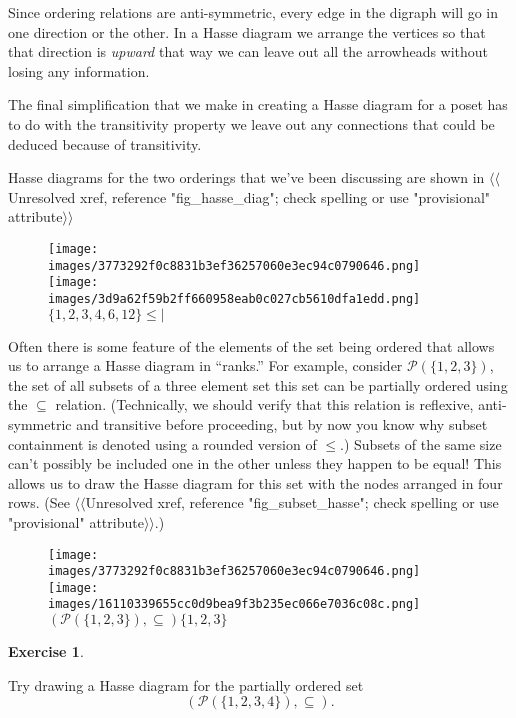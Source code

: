 \documentclass[10pt,]{book}
\theoremstyle{plain}
\theoremstyle{definition}
\theoremstyle{definition}
\newtheorem{exercise}[theorem]{Exercise}
\numberwithin{equation}{section}
\begin{document}
    Since ordering relations are anti-symmetric, every edge in the digraph
    will go in one direction or the other. In a Hasse diagram we arrange
    the vertices so that that direction is \emph{upward} \textemdash{} that way we
    can leave out all the arrowheads without losing any information.
\par

    The final simplification that we make in creating a Hasse diagram for
    a poset has to do with the transitivity property \textemdash{} we leave out any
    connections that could be deduced because of transitivity.
\par

    Hasse diagrams for the two orderings that we've been discussing are
    shown in {$\langle\langle$Unresolved xref, reference "fig\_hasse\_diag"; check spelling or use "provisional" attribute$\rangle\rangle$}
\leavevmode%
\begin{figure}
\centering
\texttt{[image: images/3773292f0c8831b3ef36257060e3ec94c0790646.png]}
\texttt{[image: images/3d9a62f59b2ff660958eab0c027cb5610dfa1edd.png]}
\(\{1,2,3,4,6,12\}\)\(\leq\)\(\mid\)\end{figure}
\par

    Often there is some feature of the elements of the set being ordered
    that allows us to arrange a Hasse diagram in ``ranks.'' For example,
    consider \({\mathcal P}(\{1,2,3\})\), the set of all subsets of a three
    element set \textemdash{} this set can be partially ordered using the \(\subseteq\)
    relation. (Technically, we should verify that this relation is reflexive,
    anti-symmetric and transitive before proceeding, but by now you know
    why subset containment is denoted using a rounded version of \(\leq\).)
    Subsets of the same size can't possibly be included one in the other
    unless they happen to be equal! This allows us to draw the Hasse
    diagram for this set with the nodes arranged in four rows.
    (See {$\langle\langle$Unresolved xref, reference "fig\_subset\_hasse"; check spelling or use "provisional" attribute$\rangle\rangle$}.)
\leavevmode%
\begin{figure}
\centering
\texttt{[image: images/3773292f0c8831b3ef36257060e3ec94c0790646.png]}
\texttt{[image: images/16110339655cc0d9bea9f3b235ec066e7036c08c.png]}
\(({\mathcal P}(\{1,2,3\}), \subseteq)\)\(\{1,2,3\}\)\end{figure}
\begin{exercise}\label{exercise-54}

        Try drawing a Hasse diagram for the partially ordered set
        \begin{equation*}
          ({\mathcal P}(\{1,2,3,4\}),\subseteq).
        \end{equation*}
\end{exercise}
\par
\end{document}

